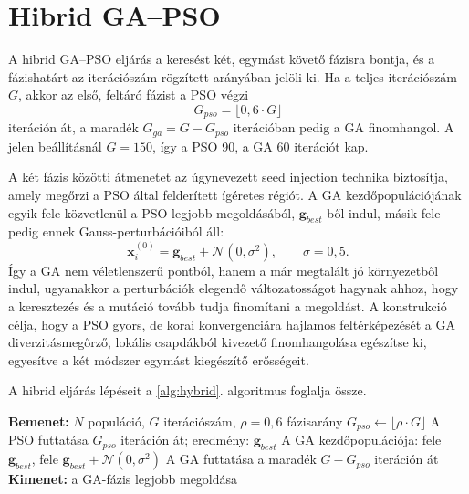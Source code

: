 \section{Hibrid GA--PSO}
A hibrid GA--PSO eljárás a keresést két, egymást követő fázisra bontja, és a fázishatárt az iterációszám rögzített arányában jelöli ki. Ha a teljes iterációszám $G$, akkor az első, feltáró fázist a PSO végzi
\begin{equation}
G_{pso} = \lfloor 0{,}6 \cdot G \rfloor
\end{equation}
iteráción át, a maradék $G_{ga} = G - G_{pso}$ iterációban pedig a GA finomhangol. A jelen beállításnál $G=150$, így a PSO 90, a GA 60 iterációt kap.

A két fázis közötti átmenetet az úgynevezett seed injection technika biztosítja, amely megőrzi a PSO által felderített ígéretes régiót. A GA kezdőpopulációjának egyik fele közvetlenül a PSO legjobb megoldásából, $\mathbf{g}_{best}$-ből indul, másik fele pedig ennek Gauss-perturbációiból áll:
\begin{equation}
\mathbf{x}^{(0)}_i = \mathbf{g}_{best} + \mathcal{N}(0,\sigma^2),\qquad \sigma = 0{,}5 .
\end{equation}
Így a GA nem véletlenszerű pontból, hanem a már megtalált jó környezetből indul, ugyanakkor a perturbációk elegendő változatosságot hagynak ahhoz, hogy a keresztezés és a mutáció tovább tudja finomítani a megoldást. A konstrukció célja, hogy a PSO gyors, de korai konvergenciára hajlamos feltérképezését a GA diverzitásmegőrző, lokális csapdákból kivezető finomhangolása egészítse ki, egyesítve a két módszer egymást kiegészítő erősségeit.

A hibrid eljárás lépéseit a \ref{alg:hybrid}. algoritmus foglalja össze.
\begin{algorithm}[H]
\caption{Hibrid GA--PSO}
\label{alg:hybrid}
\begin{algorithmic}[1]
\State \textbf{Bemenet:} $N$ populáció, $G$ iterációszám, $\rho = 0{,}6$ fázisarány
\State $G_{pso} \gets \lfloor \rho \cdot G \rfloor$
\State A PSO futtatása $G_{pso}$ iteráción át; eredmény: $\mathbf{g}_{best}$
\State A GA kezdőpopulációja: fele $\mathbf{g}_{best}$, fele $\mathbf{g}_{best} + \mathcal{N}(0,\sigma^2)$
\State A GA futtatása a maradék $G - G_{pso}$ iteráción át
\State \textbf{Kimenet:} a GA-fázis legjobb megoldása
\end{algorithmic}
\end{algorithm}

